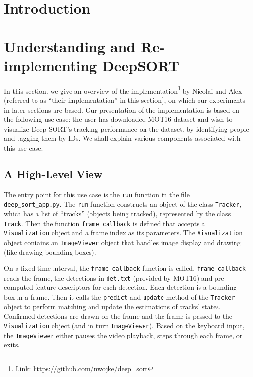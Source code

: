 \documentclass[conference]{IEEEtran}
\begin{document}
\section{Introduction}


\section{Understanding and Re-implementing DeepSORT}

In this section, we give an overview of the implementation\footnote{Link: \url{https://github.com/nwojke/deep_sort}} by Nicolai and Alex \cite{Wojke2018deep} (referred to as ``their implementation'' in this section), on which our experiments in later sections are based. Our presentation of the implementation is based on the following use case: the user has downloaded MOT16 \cite{milan2016mot16} dataset and wish to visualize Deep SORT's tracking performance on the dataset, by identifying people and tagging them by IDs. We shall explain various components associated with this use case.

\subsection{A High-Level View}

The entry point for this use case is the \texttt{run} function in the file \texttt{deep\_sort\_app.py}. The \texttt{run} function constructs an object of the class \texttt{Tracker}, which has a list of ``tracks'' (objects being tracked), represented by the class \texttt{Track}. Then the function \texttt{frame\_callback} is defined that accepts a \texttt{Visualization} object and a frame index as its parameters. The \texttt{Visualization} object contains an \texttt{ImageViewer} object that handles image display and drawing (like drawing bounding boxes).

On a fixed time interval, the \texttt{frame\_callback} function is called. \texttt{frame\_callback} reads the frame, the detections in \texttt{det.txt} (provided by MOT16) and pre-computed feature descriptors for each detection. Each detection is a bounding box in a frame. Then it calls the \texttt{predict} and \texttt{update} method of the \texttt{Tracker} object to perform matching and update the estimations of tracks' states. Confirmed detections are drawn on the frame and the frame is passed to the \texttt{Visualization} object (and in turn \texttt{ImageViewer}). Based on the keyboard input, the \texttt{ImageViewer} either pauses the video playback, steps through each frame, or exits.
\end{document}
